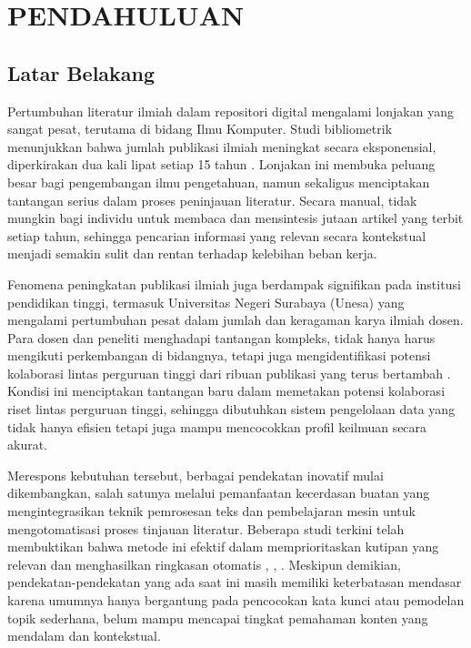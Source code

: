 \chapter{PENDAHULUAN}

\section{Latar Belakang}

Pertumbuhan literatur ilmiah dalam repositori digital mengalami lonjakan yang sangat pesat, terutama di bidang Ilmu Komputer. Studi bibliometrik menunjukkan bahwa jumlah publikasi ilmiah meningkat secara eksponensial, diperkirakan dua kali lipat setiap 15 tahun \cite{bornmann2021growthratesmodernscience}. Lonjakan ini membuka peluang besar bagi pengembangan ilmu pengetahuan, namun sekaligus menciptakan tantangan serius dalam proses peninjauan literatur. Secara manual, tidak mungkin bagi individu untuk membaca dan mensintesis jutaan artikel yang terbit setiap tahun, sehingga pencarian informasi yang relevan secara kontekstual menjadi semakin sulit dan rentan terhadap kelebihan beban kerja.

Fenomena peningkatan publikasi ilmiah juga berdampak signifikan pada institusi pendidikan tinggi, termasuk Universitas Negeri Surabaya (Unesa) yang mengalami pertumbuhan pesat dalam jumlah dan keragaman karya ilmiah dosen. Para dosen dan peneliti menghadapi tantangan kompleks, tidak hanya harus mengikuti perkembangan di bidangnya, tetapi juga mengidentifikasi potensi kolaborasi lintas perguruan tinggi dari ribuan publikasi yang terus bertambah \cite{IKASARI2024101100}. Kondisi ini menciptakan tantangan baru dalam memetakan potensi kolaborasi riset lintas perguruan tinggi, sehingga dibutuhkan sistem pengelolaan data yang tidak hanya efisien tetapi juga mampu mencocokkan profil keilmuan secara akurat. 

Merespons kebutuhan tersebut, berbagai pendekatan inovatif mulai dikembangkan, salah satunya melalui pemanfaatan kecerdasan buatan yang mengintegrasikan teknik pemrosesan teks dan pembelajaran mesin untuk mengotomatisasi proses tinjauan literatur. Beberapa studi terkini telah membuktikan bahwa metode ini efektif dalam memprioritaskan kutipan yang relevan dan menghasilkan ringkasan otomatis \cite{BannachBrown2019}, \cite{Tsafnat2018}, \cite{webist23}. Meskipun demikian, pendekatan-pendekatan yang ada saat ini masih memiliki keterbatasan mendasar karena umumnya hanya bergantung pada pencocokan kata kunci atau pemodelan topik sederhana, belum mampu mencapai tingkat pemahaman konten yang mendalam dan kontekstual.

